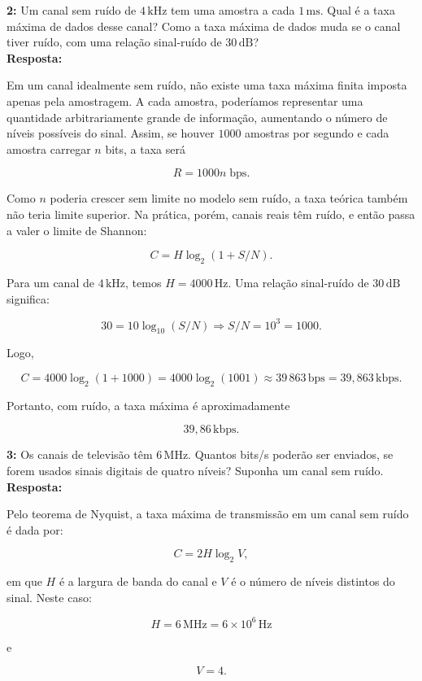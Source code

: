 \documentclass[12pt,a4paper]{report}
\begin{document}
\noindent \textbf{2:} Um canal sem ruído de $4\,\text{kHz}$ tem uma amostra a cada $1\,\text{ms}$. Qual é a taxa máxima de dados desse canal? Como a taxa máxima de dados muda se o canal tiver ruído, com uma relação sinal-ruído de $30\,\text{dB}$?\\
\textbf{Resposta:}

Em um canal idealmente sem ruído, não existe uma taxa máxima finita imposta apenas pela amostragem. A cada amostra, poderíamos representar uma quantidade arbitrariamente grande de informação, aumentando o número de níveis possíveis do sinal. Assim, se houver $1000$ amostras por segundo e cada amostra carregar $n$ bits, a taxa será

\[
R = 1000n \; \text{bps}.
\]

Como $n$ poderia crescer sem limite no modelo sem ruído, a taxa teórica também não teria limite superior. Na prática, porém, canais reais têm ruído, e então passa a valer o limite de Shannon:

\[
C = H\log_2(1+S/N).
\]

Para um canal de $4\,\text{kHz}$, temos $H = 4000\,\text{Hz}$. Uma relação sinal-ruído de $30\,\text{dB}$ significa:

\[
30 = 10\log_{10}(S/N) \Rightarrow S/N = 10^3 = 1000.
\]

Logo,

\[
C = 4000\log_2(1+1000) = 4000\log_2(1001) \approx 39\,863\,\text{bps} = 39{,}863\,\text{kbps}.
\]

Portanto, com ruído, a taxa máxima é aproximadamente

\[
\boxed{39{,}86\,\text{kbps}}.
\]


\vspace{0.6cm}

\noindent \textbf{3:} Os canais de televisão têm $6\,\text{MHz}$. Quantos bits/s poderão ser enviados, se forem usados sinais digitais de quatro níveis? Suponha um canal sem ruído.\\
\textbf{Resposta:}

Pelo teorema de Nyquist, a taxa máxima de transmissão em um canal sem ruído é dada por:

\[
C = 2H\log_2 V,
\]

em que $H$ é a largura de banda do canal e $V$ é o número de níveis distintos do sinal. Neste caso:

\[
H = 6\,\text{MHz} = 6 \times 10^6\,\text{Hz}
\]

e

\[
V = 4.
\]
\end{document}
